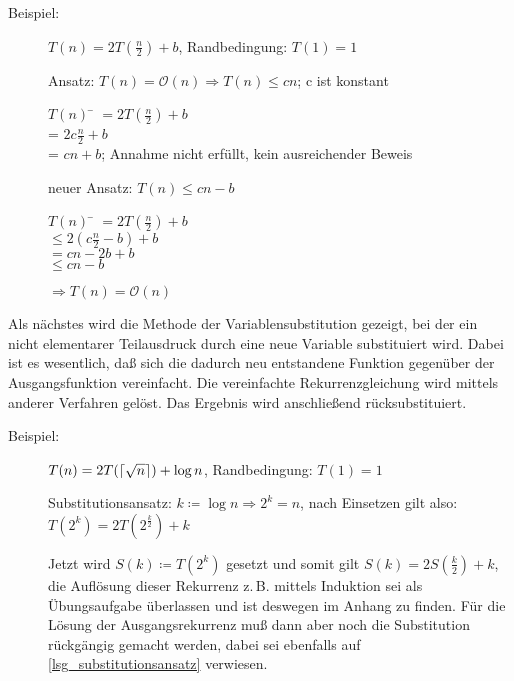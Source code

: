 \documentclass[ngerman,draft,parskip=half*,twoside]{scrreprt}
\theoremstyle{break}
\theoremstyle{nonumberbreak}
\newcommand*{\OO}{\mathcal{O}}      %
\DeclarePairedDelimiter{\ceil}{\lceil}{\rceil}
\begin{document}
	\begin{description}
		\item [Beispiel:] $T(n) = 2 T(\frac{n}{2}) + b$, Randbedingung: $T(1)=1$

		Ansatz: $T(n)=\OO(n)\Rightarrow T(n)\leq c n$; c ist konstant
		\begin{tabbing}
			$T(n)$ \= $= 2 T(\frac{n}{2})+b$\\
			\> = $2c \frac{n}{2} +b$\\
			\> = $c n+b$; Annahme nicht erfüllt, kein ausreichender Beweis
		\end{tabbing}
		neuer Ansatz: $T(n)\leq c n-b$
		\begin{tabbing}
			$T(n)$ \= $=2 T(\frac{n}{2} )+b$\\
			\> $\leq 2(c \frac{n}{2}-b)+b$\\
			\> $=c n-2 b+b$\\
			\> $\leq c n-b$
		\end{tabbing}
		$\Rightarrow T(n)=\OO(n)$
	\end{description}
			
Als nächstes wird die Methode der Variablensubstitution gezeigt,
bei der ein nicht elementarer Teilausdruck durch eine neue Variable substituiert wird. Dabei ist es wesentlich, daß
sich die dadurch neu entstandene Funktion gegenüber der Ausgangsfunktion vereinfacht. Die vereinfachte Rekurrenzgleichung wird
mittels anderer Verfahren gelöst. Das Ergebnis wird anschließend rücksubstituiert.
	\begin{description}
		\item [Beispiel:] $T(n) = 2 T(\ceil{\sqrt{n}}) + \log n$, Randbedingung: $T(1)=1$

		Substitutionsansatz: $k\coloneqq\log n \Rightarrow 2^k=n$, nach Einsetzen gilt also: $T(2^k) = 2 T(2^{\frac{k}{2}})+k$
		
		Jetzt wird $S(k) \coloneqq T(2^k)$ gesetzt und somit gilt $S(k) = 2 S(\frac{k}{2})+k$, die Auflösung dieser
		Rekurrenz z.\,B. mittels Induktion sei als Übungsaufgabe überlassen und ist deswegen im Anhang zu finden. 
		Für die Lösung der Ausgangsrekurrenz muß dann aber noch die Substitution rückgängig gemacht werden, dabei sei
		ebenfalls auf \autoref{lsg_substitutionsansatz} verwiesen. 
	\end{description}	
\end{document}
